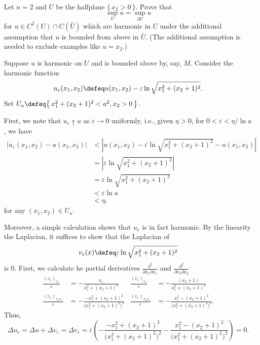 \begin{problem}
  Let \(n=2\) and \(U\) be the halfplane \(\{\,x_2>0\,\}\). Prove that
  \[
    \sup_U u=\sup_{\partial U}u
  \]
  for \(u\in C^2(U)\cap C(\bar U)\) which are harmonic in \(U\) under the
  additional assumption that \(u\) is bounded from above in \(\bar
  U\). (The additional assumption is needed to exclude examples like
  \(u=x_2\).)

\end{problem}
\begin{solution}
  Suppose \(u\) is harmonic on \(U\) and is bounded above by, say, \(M\).
  Consider the harmonic function
  \[
    u_\varepsilon(x_1,x_2)\defeq
    u(x_1,x_2)-\varepsilon\ln\sqrt{x_1^2+(x_2+1)^2}.
  \]
  Set \(U_a\defeq \bigl\{\,x_1^2+(x_2+1)^2<a^2,x_2>0\,\bigr\}\).

  First, we note that \(u_\varepsilon\uparrow u\) as \(\varepsilon\to 0\)
  uniformly, i.e., given \(\eta>0\), for \(0<\varepsilon<\eta/{\ln a}\),
  we have
  \begin{align*}
    |u_\varepsilon(x_1,x_2)-u(x_1,x_2)|
    &<\left|
      u(x_1,x_2)-\varepsilon\ln\sqrt{x_1^2+(x_2+1)^2}
      -u(x_1,x_2)
      \right|\\
    &=\left|
      \varepsilon\ln\sqrt{x_1^2+(x_2+1)^2}
      \right|\\
    &=\varepsilon\ln\sqrt{x_1^2+(x_2+1)^2}\\
    &<\varepsilon\ln a\\
    &<\eta,
  \end{align*}
  for any \((x_1,x_2)\in U_a\).

  Moreover, a simple calculation shows that \(u_\varepsilon\) is in fact
  harmonic. By the linearity the Laplacian, it suffices to show that the
  Laplacian of
  \[
    v_\varepsilon(x)\defeq\varepsilon\ln\sqrt{x_1^2+(x_2+1)^2}%
  \]
  is \(0\). First, we calculate he partial derivatives
  \(\frac{\partial^2}{\partial x_1\partial x_1}\) and
  \(\frac{\partial^2}{\partial x_2\partial x_2}\)
  \begin{align*}
   \frac{(v_\varepsilon)_{x_1}}{\varepsilon}
    &=-\frac{x_1}{x_1^2+(x_2+1)^2}
    &\frac{(v_\varepsilon)_{x_2}}{\varepsilon}
    &=-\frac{(x_2+1)}{x_1^2+(x_2+1)^2}\\
    \frac{(v_{\varepsilon})_{x_1x_1}}{\varepsilon}
    &=-\frac{-x_1^2+(x_2+1)^2}{\bigl(x_1^2+(x_2+1)^2\bigr)^2}
    &\frac{(v_{\varepsilon})_{x_2x_2}}{\varepsilon}
    &=-\frac{x_1^2-(x_2+1)^2}{\bigl(x_1^2+(x_2+1)^2\bigr)^2}.
  \end{align*}
  Thus,
  \[
    \Delta u_\varepsilon=\Delta u+\Delta v_\varepsilon=
    \Delta v_\varepsilon=\varepsilon
    \left(
      -\frac{-x_1^2+(x_2+1)^2}{\bigl(x_1^2+(x_2+1)^2\bigr)^2}
      -\frac{x_1^2-(x_2+1)^2}{\bigl(x_1^2+(x_2+1)^2\bigr)^2}
    \right)=0.
  \]


\end{solution}
